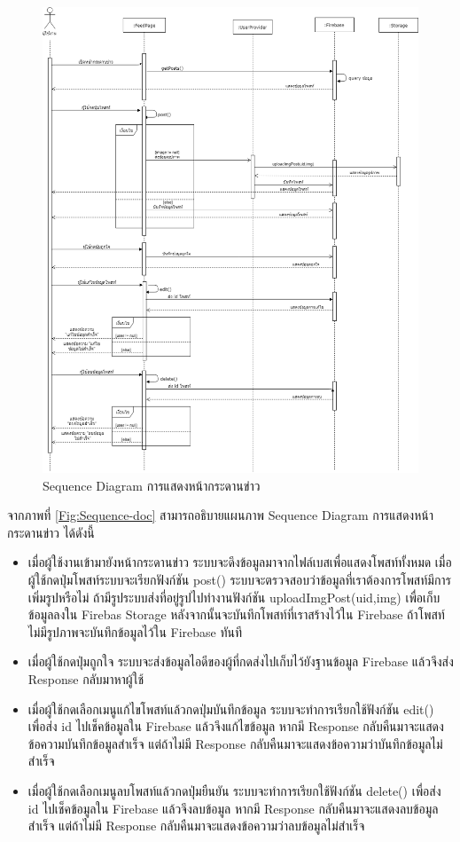 	\begin{figure}[H]
		\centering
		\includegraphics[width=1.0\columnwidth]
		{Figures/3/Sequence/feed}
		\caption{Sequence Diagram การแสดงหน้ากระดานข่าว}
		\label{Fig:Sequence-feed}
	\end{figure}
	\newpage
	จากภาพที่ \ref{Fig:Sequence-doc} สามารถอธิบายแผนภาพ Sequence Diagram การแสดงหน้ากระดานข่าว ได้ดังนี้ 
	\begin{itemize}
	\item เมื่อผู้ใช้งานเข้ามายังหน้ากระดานข่าว ระบบจะดึงข้อมูลมาจากไฟล์เบสเพื่อแสดงโพสท์ทั้งหมด เมื่อผู้ใช้กดปุ่มโพสท์ระบบจะเรียกฟังก์ชัน post() 
	ระบบจะตรวจสอบว่าข้อมูลที่เราต้องการโพสท์มีการเพิ่มรูปหรือไม่ ถ้ามีรูประบบส่งที่อยู่รูปไปทำงานฟังก์ชัน uploadImgPost(uid,img) 
	เพื่อเก็บข้อมูลลงใน Firebas Storage หลังจากนั้นจะบันทึกโพสท์ที่เราสร้างไว้ใน Firebase ถ้าโพสท์ไม่มีรูปภาพจะบันทึกข้อมูลไว้ใน Firebase ทันที 
	\item เมื่อผู้ใช้กดปุ่มถูกใจ ระบบจะส่งข้อมูลไอดีของผู้ที่กดส่งไปเก็บไว้ยังฐานข้อมูล Firebase แล้วจึงส่ง Response กลับมาหาผู้ใช้
	\item เมื่อผู้ใช้กดเลือกเมนูแก้ไขโพสท์แล้วกดปุ่มบันทึกข้อมูล ระบบจะทำการเรียกใช้ฟังก์ชัน edit() เพื่อส่ง id ไปเช็คข้อมูลใน Firebase แล้วจึงแก้ไขข้อมูล หากมี Response กลับคืนมาจะแสดงข้อความบันทึกข้อมูลสำเร็จ แต่ถ้าไม่มี Response กลับคืนมาจะแสดงข้อความว่าบันทึกข้อมูลไม่สำเร็จ
	\item เมื่อผู้ใช้กดเลือกเมนูลบโพสท์แล้วกดปุ่มยืนยัน ระบบจะทำการเรียกใช้ฟังก์ชัน delete() เพื่อส่ง id ไปเช็คข้อมูลใน Firebase แล้วจึงลบข้อมูล หากมี Response กลับคืนมาจะแสดงลบข้อมูลสำเร็จ แต่ถ้าไม่มี Response กลับคืนมาจะแสดงข้อความว่าลบข้อมูลไม่สำเร็จ
	\end{itemize}
	\newpage	

